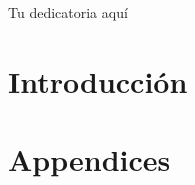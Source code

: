 \documentclass[titlepage,openright,twoside,a4paper,final,12pt,spanish]{book}
\author{Álvaro González Jiménez}{Grado en Ingeniería Informática - Ingeniería del Software}{D.~}{53585603L}
\begin{document}
\makeTitlePage

\pagestyle{empty}
\begin{dedication}
Tu dedicatoria aquí
\end{dedication}
\pagestyle{trinidadPhD}



\tableofcontents
\listoffigures
\listoftables
\listoftodos
\newpage


\lineNumbersOn
\part{Introducción}



\part{Appendices}
\appendix


\lineNumbersOff

\printglossaries
\newpage
\end{document}
